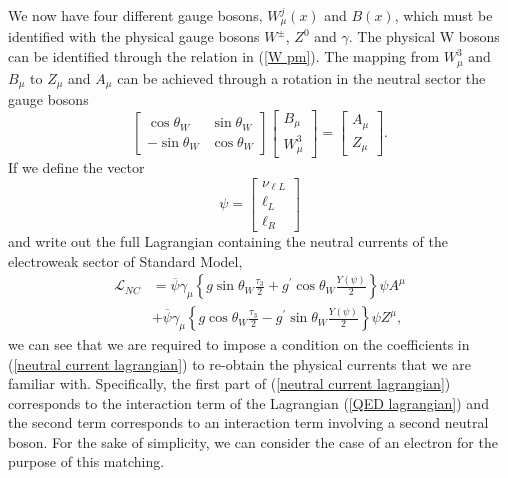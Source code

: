 \documentclass[10pt,a4paper]{book}
\begin{document}
We now have four different gauge bosons, $W^j_\mu(x)$ and $B(x)$, which must be identified with the physical gauge bosons $W^\pm$, $Z^0$ and $\gamma$. The physical W bosons can be identified through the relation in (\ref{W pm}). The mapping from $W^3_\mu$ and $B_\mu$ to $Z_\mu$ and $A_\mu$ can be achieved through a rotation in the neutral sector the gauge bosons
\begin{equation}
\label{mapping}
\begin{bmatrix}
\cos\theta_W & \sin\theta_W \\
-\sin\theta_W & \cos\theta_W
\end{bmatrix}
\begin{bmatrix}
B_\mu \\
W^3_\mu
\end{bmatrix} =
\begin{bmatrix}
A_\mu \\
Z_\mu
\end{bmatrix}.
\end{equation}
If we define the vector
\begin{equation}
\psi = \begin{bmatrix}
\nu_{\ell L} \\
\ell_L\\
\ell_R
\end{bmatrix}
\end{equation} 
and write out the full Lagrangian containing the neutral currents of the electroweak sector of Standard Model,
\begin{equation}
\label{neutral current lagrangian}
\begin{aligned}
\mathcal{L}_{NC} &= \overline{\psi}\gamma_\mu\left\lbrace g \sin\theta_W \frac{\tau_3}{2} + g^\prime \cos\theta_W \frac{Y(\psi)}{2} \right\rbrace \psi A^\mu \\
&+\overline{\psi}\gamma_\mu \left\lbrace g\cos\theta_W \frac{\tau_3}{2}- g^\prime\sin\theta_W\frac{Y(\psi)}{2}\right\rbrace\psi Z^\mu,
\end{aligned}
\end{equation}
we can see that we are required to impose a condition on the coefficients in (\ref{neutral current lagrangian}) to re-obtain the physical currents that we are familiar with. Specifically, the first part of (\ref{neutral current lagrangian}) corresponds to the interaction term of the Lagrangian (\ref{QED lagrangian}) and the second term corresponds to an interaction term involving a second neutral boson. For the sake of simplicity, we can consider the case of an electron for the purpose of this matching.
\end{document}
